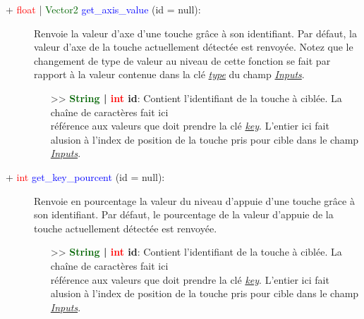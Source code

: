 \documentclass[a4paper, 11pt]{article}
\begin{document}
	\begin{description}
		\item [+ \textcolor{red}{float} | \textcolor{darkgreen}{Vector2} \textcolor{blue}{get\_axis\_value} 
		(id = null):] Renvoie la valeur d'axe d'une touche grâce à son identifiant. Par défaut, la valeur 
		d'axe de la touche actuellement détectée est renvoyée. Notez que le changement de type de valeur au 
		niveau de cette fonction se fait par rapport à la valeur contenue dans la clé
		\textit{\hyperlink{type}{type}} du champ \textit{\hyperlink{inputs}{Inputs}}.
		\begin{itemize}
			\item [>> \textbf{\textcolor{darkgreen}{String} | \textcolor{red}{int} id}:] Contient 
			l'identifiant de la touche à ciblée. La chaîne de caractères fait ici \\référence aux valeurs 
			que doit prendre la clé \textit{\hyperlink{key}{key}}. L'entier ici fait alusion à l'index de 
			position de la touche pris pour cible dans le champ \textit{\hyperlink{inputs}{Inputs}}.\\
		\end{itemize}
	\end{description}
	\begin{description}
		\item [+ \textcolor{red}{int} \textcolor{blue}{get\_key\_pourcent} (id = null):] Renvoie en 
		pourcentage la valeur du niveau d'appuie d'une touche grâce à son identifiant. Par défaut, le 
		pourcentage de la valeur d'appuie de la touche actuellement détectée est renvoyée.
		\begin{itemize}
			\item [>> \textbf{\textcolor{darkgreen}{String} | \textcolor{red}{int} id}:] Contient 
			l'identifiant de la touche à ciblée. La chaîne de caractères fait ici \\référence aux valeurs 
			que doit prendre la clé \textit{\hyperlink{key}{key}}. L'entier ici fait alusion à l'index de 
			position de la touche pris pour cible dans le champ \textit{\hyperlink{inputs}{Inputs}}.\\
		\end{itemize}
	\end{description}
\end{document}

